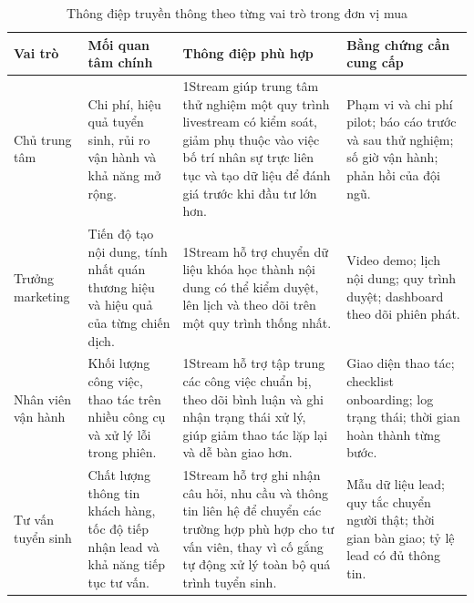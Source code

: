 \begin{table}[htbp]
    \centering
    \caption{Thông điệp truyền thông theo từng vai trò trong đơn vị mua}
    \label{tab:message-by-buying-role}
    \begin{tabular}{
        p{}
        p{}
        p{}
        p{}
    }
        \hline
        \textbf{Vai trò}
        & \textbf{Mối quan tâm chính}
        & \textbf{Thông điệp phù hợp}
        & \textbf{Bằng chứng cần cung cấp} \\
        \hline

        Chủ trung tâm
        &
        Chi phí, hiệu quả tuyển sinh, rủi ro vận hành và khả năng mở rộng.
        &
        1Stream giúp trung tâm thử nghiệm một quy trình livestream có kiểm soát, giảm phụ thuộc vào việc bố trí nhân sự trực liên tục và tạo dữ liệu để đánh giá trước khi đầu tư lớn hơn.
        &
        Phạm vi và chi phí pilot; báo cáo trước và sau thử nghiệm; số giờ vận hành; phản hồi của đội ngũ. \\

        \hline

        Trưởng marketing
        &
        Tiến độ tạo nội dung, tính nhất quán thương hiệu và hiệu quả của từng chiến dịch.
        &
        1Stream hỗ trợ chuyển dữ liệu khóa học thành nội dung có thể kiểm duyệt, lên lịch và theo dõi trên một quy trình thống nhất.
        &
        Video demo; lịch nội dung; quy trình duyệt; dashboard theo dõi phiên phát. \\

        \hline

        Nhân viên vận hành
        &
        Khối lượng công việc, thao tác trên nhiều công cụ và xử lý lỗi trong phiên.
        &
        1Stream hỗ trợ tập trung các công việc chuẩn bị, theo dõi bình luận và ghi nhận trạng thái xử lý, giúp giảm thao tác lặp lại và dễ bàn giao hơn.
        &
        Giao diện thao tác; checklist onboarding; log trạng thái; thời gian hoàn thành từng bước. \\

        \hline

        Tư vấn tuyển sinh
        &
        Chất lượng thông tin khách hàng, tốc độ tiếp nhận lead và khả năng tiếp tục tư vấn.
        &
        1Stream hỗ trợ ghi nhận câu hỏi, nhu cầu và thông tin liên hệ để chuyển các trường hợp phù hợp cho tư vấn viên, thay vì cố gắng tự động xử lý toàn bộ quá trình tuyển sinh.
        &
        Mẫu dữ liệu lead; quy tắc chuyển người thật; thời gian bàn giao; tỷ lệ lead có đủ thông tin. \\

        \hline
    \end{tabular}
\end{table}

